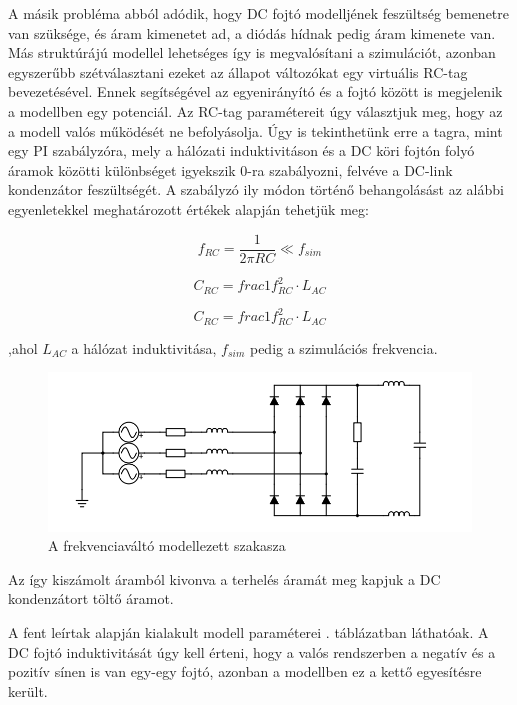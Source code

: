A másik probléma abból adódik, hogy DC fojtó modelljének feszültség bemenetre van szüksége, és áram kimenetet ad, a diódás hídnak pedig áram kimenete van. Más struktúrájú modellel lehetséges így is megvalósítani a szimulációt, azonban egyszerűbb szétválasztani ezeket az állapot változókat egy virtuális RC-tag bevezetésével. Ennek segítségével az egyenirányító és a fojtó között is megjelenik a modellben egy potenciál. Az RC-tag paramétereit úgy választjuk meg, hogy az a modell valós működését ne befolyásolja. Úgy is tekinthetünk erre a tagra, mint egy PI szabályzóra, mely a hálózati induktivitáson és a DC köri fojtón folyó áramok közötti különbséget igyekszik $0$-ra szabályozni, felvéve a DC-link kondenzátor feszültségét. A szabályzó ily módon történő behangolásást az alábbi egyenletekkel meghatározott értékek alapján tehetjük meg:

\begin{equation}
f_{RC} = \frac{1}{2\pi{}RC} \ll f_{sim}
\end{equation}

\begin{equation}
C_{RC} = frac{1}{f_{RC}^2\cdot{}L_{AC}}
\end{equation}

\begin{equation}
C_{RC} = frac{1}{f_{RC}^2\cdot{}L_{AC}}
\end{equation}

,ahol $L_{AC}$ a hálózat induktivitása, $f_{sim}$ pedig a szimulációs frekvencia.

\begin{figure}[H!]
	\centering
	\includegraphics[width = \textwidth]{figures/VFD_virtual_RC.png}
	\caption{A frekvenciaváltó modellezett szakasza} 
	\label{fig:virtualRC}
\end{figure}

Az így kiszámolt áramból kivonva a terhelés áramát meg kapjuk a DC kondenzátort töltő áramot.

A fent leírtak alapján kialakult modell paraméterei . táblázatban láthatóak. A DC fojtó induktivitását úgy kell érteni, hogy a valós rendszerben a negatív és a pozitív sínen is van egy-egy fojtó, azonban a modellben ez a kettő egyesítésre került.

